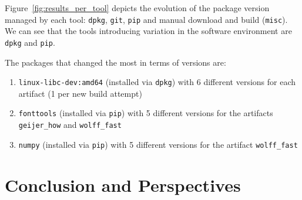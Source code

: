 \documentclass[sigconf,natbib=false]{acmart}
\begin{document}
Figure~\ref{fig:results_per_tool} depicts the evolution of the package version managed by each tool: \texttt{dpkg}, \texttt{git}, \texttt{pip} and manual download and build (\texttt{misc}).
We can see that the tools introducing variation in the software environment are \texttt{dpkg} and \texttt{pip}.

The packages that changed the most in terms of versions are:
\begin{enumerate}
\item \texttt{linux-libc-dev:amd64} (installed via \texttt{dpkg}) with 6 different versions for each artifact (1 per new build attempt)
\item \texttt{fonttools} (installed via \texttt{pip}) with 5 different versions for the artifacts \texttt{geijer\_how} and \texttt{wolff\_fast}
\item \texttt{numpy} (installed via \texttt{pip}) with 5 different versions for the artifact \texttt{wolff\_fast}
\end{enumerate}


\section{Conclusion and Perspectives}\label{sec:conclusion}
\end{document}
